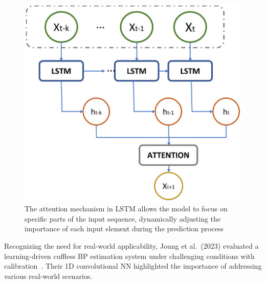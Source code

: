 \begin{figure}
    \begin{minipage}[c]{0.5\textwidth}
        \includegraphics[width=\textwidth]{images/ml/attention}
    \end{minipage}\hfill
    \begin{minipage}[c]{0.5\textwidth}
        \captionsetup{format=plain, justification=centering}
        \caption{\small The attention mechanism in LSTM allows the model to focus on specific parts of the input sequence, dynamically adjusting the importance of each input element during the prediction process~\cite{marulandaHybridModelBased2023}}
        \label{fig:attention}
    \end{minipage}
\end{figure}


Recognizing the need for real-world applicability, Joung et al.\ (2023) evaluated a learning-driven cuffless BP estimation system under challenging conditions with calibration~\cite{joungContinuousCufflessBlood2023}.
Their 1D convolutional NN highlighted the importance of addressing various real-world scenarios.

